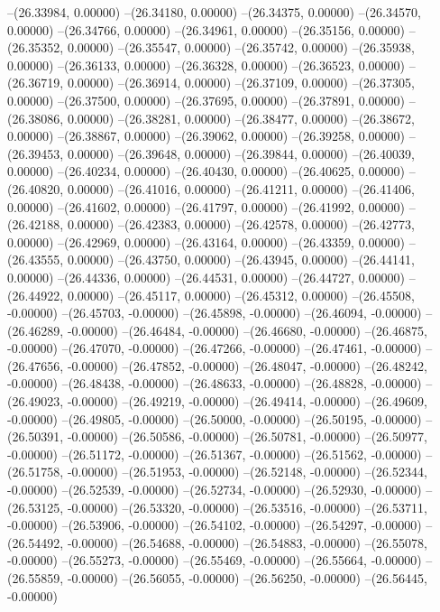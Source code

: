 --(26.33984, 0.00000)
--(26.34180, 0.00000)
--(26.34375, 0.00000)
--(26.34570, 0.00000)
--(26.34766, 0.00000)
--(26.34961, 0.00000)
--(26.35156, 0.00000)
--(26.35352, 0.00000)
--(26.35547, 0.00000)
--(26.35742, 0.00000)
--(26.35938, 0.00000)
--(26.36133, 0.00000)
--(26.36328, 0.00000)
--(26.36523, 0.00000)
--(26.36719, 0.00000)
--(26.36914, 0.00000)
--(26.37109, 0.00000)
--(26.37305, 0.00000)
--(26.37500, 0.00000)
--(26.37695, 0.00000)
--(26.37891, 0.00000)
--(26.38086, 0.00000)
--(26.38281, 0.00000)
--(26.38477, 0.00000)
--(26.38672, 0.00000)
--(26.38867, 0.00000)
--(26.39062, 0.00000)
--(26.39258, 0.00000)
--(26.39453, 0.00000)
--(26.39648, 0.00000)
--(26.39844, 0.00000)
--(26.40039, 0.00000)
--(26.40234, 0.00000)
--(26.40430, 0.00000)
--(26.40625, 0.00000)
--(26.40820, 0.00000)
--(26.41016, 0.00000)
--(26.41211, 0.00000)
--(26.41406, 0.00000)
--(26.41602, 0.00000)
--(26.41797, 0.00000)
--(26.41992, 0.00000)
--(26.42188, 0.00000)
--(26.42383, 0.00000)
--(26.42578, 0.00000)
--(26.42773, 0.00000)
--(26.42969, 0.00000)
--(26.43164, 0.00000)
--(26.43359, 0.00000)
--(26.43555, 0.00000)
--(26.43750, 0.00000)
--(26.43945, 0.00000)
--(26.44141, 0.00000)
--(26.44336, 0.00000)
--(26.44531, 0.00000)
--(26.44727, 0.00000)
--(26.44922, 0.00000)
--(26.45117, 0.00000)
--(26.45312, 0.00000)
--(26.45508, -0.00000)
--(26.45703, -0.00000)
--(26.45898, -0.00000)
--(26.46094, -0.00000)
--(26.46289, -0.00000)
--(26.46484, -0.00000)
--(26.46680, -0.00000)
--(26.46875, -0.00000)
--(26.47070, -0.00000)
--(26.47266, -0.00000)
--(26.47461, -0.00000)
--(26.47656, -0.00000)
--(26.47852, -0.00000)
--(26.48047, -0.00000)
--(26.48242, -0.00000)
--(26.48438, -0.00000)
--(26.48633, -0.00000)
--(26.48828, -0.00000)
--(26.49023, -0.00000)
--(26.49219, -0.00000)
--(26.49414, -0.00000)
--(26.49609, -0.00000)
--(26.49805, -0.00000)
--(26.50000, -0.00000)
--(26.50195, -0.00000)
--(26.50391, -0.00000)
--(26.50586, -0.00000)
--(26.50781, -0.00000)
--(26.50977, -0.00000)
--(26.51172, -0.00000)
--(26.51367, -0.00000)
--(26.51562, -0.00000)
--(26.51758, -0.00000)
--(26.51953, -0.00000)
--(26.52148, -0.00000)
--(26.52344, -0.00000)
--(26.52539, -0.00000)
--(26.52734, -0.00000)
--(26.52930, -0.00000)
--(26.53125, -0.00000)
--(26.53320, -0.00000)
--(26.53516, -0.00000)
--(26.53711, -0.00000)
--(26.53906, -0.00000)
--(26.54102, -0.00000)
--(26.54297, -0.00000)
--(26.54492, -0.00000)
--(26.54688, -0.00000)
--(26.54883, -0.00000)
--(26.55078, -0.00000)
--(26.55273, -0.00000)
--(26.55469, -0.00000)
--(26.55664, -0.00000)
--(26.55859, -0.00000)
--(26.56055, -0.00000)
--(26.56250, -0.00000)
--(26.56445, -0.00000)
